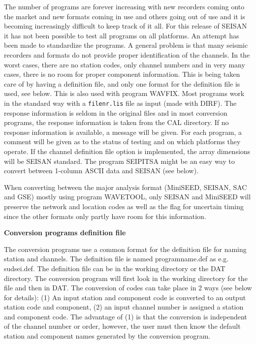 The number of programs are forever increasing with new recorders coming onto the market and new formats coming in use and others going out of use and it is becoming increasingly difficult to keep track of it all. For this release of SEISAN it has not been possible to test all programs on all platforms. An attempt has been made to standardize the programs. A general problem is that many seismic recorders and formats do not provide proper identification of the channels. In the worst cases, there are no station codes, only channel numbers and in very many cases, there is no room for proper component information. This is being taken care of by having a definition file, and only one format for the definition file is used, see below. This is also used with program WAVFIX. \newline
Most programs work in the standard way with a \texttt{filenr.lis} file as input (made with DIRF). \newline
The response information is seldom in the original files and in most conversion programs, the response information is taken from the CAL directory. If no response information is available, a message will be given. For each program, a comment will be given as to the status of testing and on which platforms they operate. If the channel definition file option is implemented, the array dimensions will be SEISAN standard. \newline
The program SEIPITSA might be an easy way to convert between 1-column ASCII data and SEISAN (see below). 

When converting between the major analysis format (MiniSEED, SEISAN, SAC and GSE) mostly using program WAVETOOL, only SEISAN and MiniSEED will preserve the network and location codes as well as the flag for uncertain timing since the other formats only partly have room for this information.  

\textbf{Conversion programs definition file}

The conversion programs use a common format for the definition file for naming station and channels. The definition file is named programname.def as e.g. sudsei.def. The definition file can be in the working directory or the DAT directory. The conversion program will first look in the working directory for the file and then in DAT. The conversion of codes can take place in 2 ways (see below for details): 
(1) An input station and component code is converted to an output station code and component, (2) an input channel number is assigned a station and component code. The advantage of (1) is that the conversion is independent of the channel number or order, however, the user must then know the default station and component names generated by the conversion program. 

